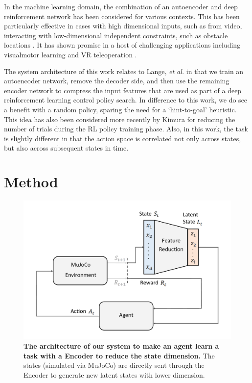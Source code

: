 \documentclass[letterpaper, 10 pt, conference]{ieeeconf}
\begin{document}
In the machine learning domain, the combination of an autoencoder and deep reinforcement network has been considered for various contexts. 
This has been particularly effective in cases with high dimensional inputs, such as from video, interacting with low-dimensional independent constraints, such as obstacle locations \cite{finn2016deep, bitzer2010using, lynch2019learning}.  
It has shown promise in a host of challenging applications including visualmotor learning \cite{finn2016deep} and VR teleoperation \cite{zhang2018deep}. 

The system architecture of this work relates to Lange, \emph{et al.} \cite{lange2010deep} in that we train an autoencoder network, remove the decoder side, and then use the remaining encoder network to compress the input features that are used as part of a deep reinforcement learning control policy search.  In difference to this work, we do see a benefit with a random policy, sparing the need for a `hint-to-goal' heuristic.  This idea has also been considered more recently by Kimura \cite{kimura2018daqn} for reducing the number of trials during the RL policy training phase.  
Also, in this work, the task is slightly different in that the action space is correlated not only across states, but also across subsequent states in time.  



\section{Method}





\begin{figure}[t]
    \centering
    \includegraphics[width=\linewidth]{fig-system-arch}
    \caption{
        \textbf{The architecture of our system to make an agent learn a task with a Encoder to reduce the state dimension.} The states (simulated via MuJoCo) are directly sent through the Encoder to generate new latent states with lower dimension.
    }
    \label{fig:system-arch}
\end{figure}
\end{document}
